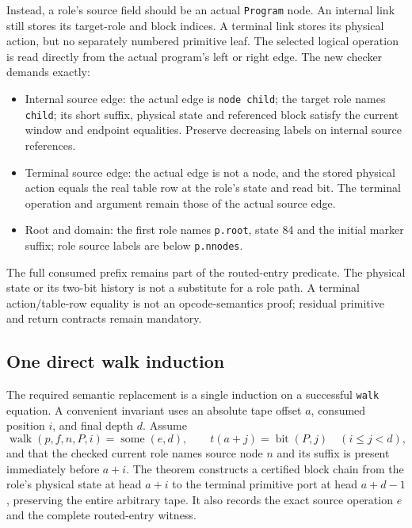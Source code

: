 Instead, a role's source field should be an actual \texttt{Program} node.
An internal link still stores its target-role and block indices. A terminal
link stores its physical action, but no separately numbered primitive leaf.
The selected logical operation is read directly from the actual program's
left or right edge. The new checker demands exactly:
\begin{itemize}
\item Internal source edge: the actual edge is \texttt{node child}; the target
  role names \texttt{child}; its short suffix, physical state and referenced
  block satisfy the current window and endpoint equalities. Preserve
  decreasing labels on internal source references.
\item Terminal source edge: the actual edge is not a node, and the stored
  physical action equals the real table row at the role's state and read bit.
  The terminal operation and argument remain those of the actual source edge.
\item Root and domain: the first role names \texttt{p.root}, state 84 and the
  initial marker suffix; role source labels are below \texttt{p.nnodes}.
\end{itemize}

The full consumed prefix remains part of the routed-entry predicate. The
physical state or its two-bit history is not a substitute for a role path.
A terminal action/table-row equality is not an opcode-semantics proof;
residual primitive and return contracts remain mandatory.

\subsection{One direct walk induction}
The required semantic replacement is a single induction on a successful
\texttt{walk} equation. A convenient invariant uses an absolute tape offset
$a$, consumed position $i$, and final depth $d$. Assume
\[
 \operatorname{walk}(p,f,n,P,i)=\operatorname{some}(e,d),
 \qquad t(a+j)=\operatorname{bit}(P,j)\quad(i\leq j<d),
\]
and that the checked current role names source node $n$ and its suffix is
present immediately before $a+i$. The theorem constructs a certified block
chain from the role's physical state at head $a+i$ to the terminal primitive
port at head $a+d-1$, preserving the entire arbitrary tape. It also records
the exact source operation $e$ and the complete routed-entry witness.

